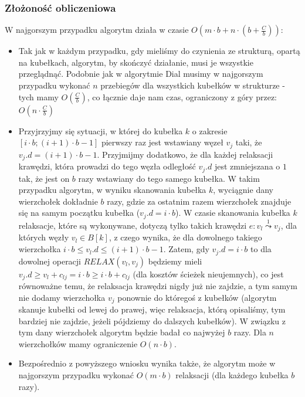 \subsubsection{Złożoność obliczeniowa}

W najgorszym przypadku algorytm działa w czasie $ O \left( m \cdot b + n \cdot \left( b + \frac{C}{b}\right) \right)$:

\begin{itemize}
\item Tak jak w każdym przypadku, gdy mieliśmy do czynienia ze strukturą, opartą na kubełkach, algorytm, by skończyć działanie, musi je wszystkie przeglądnąć. Podobnie jak w algorytmie Dial musimy w najgorszym przypadku wykonać $n$ przebiegów dla wszystkich kubełków w strukturze - tych mamy $O \left( \frac{C}{b} \right)$, co łącznie daje nam czas, ograniczony z góry przez: $O \left( n \cdot \frac{C}{b} \right)$
\item Przyjrzyjmy się sytuacji, w której do kubełka $k$ o zakresie $\left[ i \cdot b ; \left( i + 1 \right) \cdot b - 1 \right]$ pierwszy raz jest wstawiany węzeł $v_{j}$ taki, że $v_{j}.d = \left( i + 1 \right) \cdot b - 1$. Przyjmijmy dodatkowo, że dla każdej relaksacji krawędzi, która prowadzi do tego węzła odległość $v_{j}.d$ jest zmniejszana o $1$ tak, że jest on $b$ razy wstawiany do tego samego kubełka. W takim przypadku algorytm, w wyniku skanowania kubełka $k$, wyciągnie dany wierzchołek dokładnie $b$ razy, gdzie za ostatnim razem wierzchołek znajduje się na samym początku kubełka ($v_{j}.d = i \cdot b$). W czasie skanowania kubełka $k$ relaksacje, które są wykonywane, dotyczą tylko takich krawędzi $e : v_{l} \overset{1}\leadsto v_{j}$, dla których węzły $v_{l} \in B \left[ k \right]$, z czego wynika, że dla dowolnego takiego wierzchołka $ i \cdot b \leqslant v_{l}.d \leqslant \left( i + 1 \right) \cdot b - 1$. Zatem, gdy $v_{j}.d = i \cdot b$ to dla dowolnej operacji $RELAX \left( v_{l}, v_{j} \right)$ będziemy mieli $ v_{j}.d \geqslant v_{l} + c_{lj} = i \cdot b \geqslant i \cdot b + c_{lj}$ (dla kosztów ścieżek nieujemnych), co jest równoważne temu, że relaksacja krawędzi nigdy już nie zajdzie, a tym samym nie dodamy wierzchołka $v_{j}$ ponownie do któregoś z kubełków (algorytm skanuje kubełki od lewej do prawej, więc relaksacja, którą opisaliśmy, tym bardziej nie zajdzie, jeżeli pójdziemy do dalszych kubełków). W związku z tym dany  wierzchołek algorytm będzie badał co najwyżej $b$ razy. Dla $n$ wierzchołków mamy ograniczenie $O \left( n \cdot b \right)$.
\item Bezpośrednio z powyższego wniosku wynika także, że algorytm może w najgorszym przypadku wykonać $O \left( m \cdot b \right)$ relaksacji (dla każdego kubełka $b$ razy).
\end{itemize}

